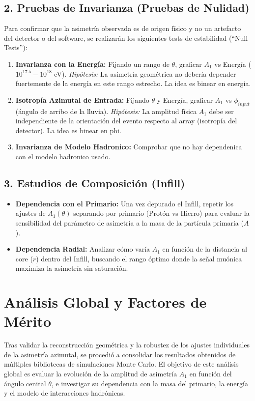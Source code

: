 \subsection*{2. Pruebas de Invarianza (Pruebas de Nulidad)}
Para confirmar que la asimetría observada es de origen físico y no un artefacto del detector o del software, se realizarán los siguientes tests de estabilidad (``Null Tests''):

\begin{enumerate}
	\item \textbf{Invarianza con la Energía:} Fijando un rango de $\theta$, graficar $A_1$ vs Energía ($10^{17.5} - 10^{18}$ eV). \textit{Hipótesis:} La asimetría geométrica no debería depender fuertemente de la energía en este rango estrecho.  La idea es binear en energia.
	\item \textbf{Isotropía Azimutal de Entrada:} Fijando $\theta$ y Energía, graficar $A_1$ vs $\phi_{input}$ (ángulo de arribo de la lluvia). \textit{Hipótesis:} La amplitud física $A_1$ debe ser independiente de la orientación del evento respecto al array (isotropía del detector). La idea es binear en phi.
	\item \textbf{Invarianza de Modelo Hadronico:} Comprobar que no hay dependenica con el modelo hadronico usado.
\end{enumerate}

\subsection*{3. Estudios de Composición (Infill)}
\begin{itemize}
	\item \textbf{Dependencia con el Primario:} Una vez depurado el Infill, repetir los ajustes de $A_1(\theta)$ separando por primario (Protón vs Hierro) para evaluar la sensibilidad del parámetro de asimetría a la masa de la partícula primaria ($A$).
	\item \textbf{Dependencia Radial:} Analizar cómo varía $A_1$ en función de la distancia al core ($r$) dentro del Infill, buscando el rango óptimo donde la señal muónica maximiza la asimetría sin saturación.
\end{itemize}


\section{Análisis Global y Factores de Mérito}
\label{sec:analisis_global}

Tras validar la reconstrucción geométrica y la robustez de los ajustes individuales de la asimetría azimutal, se procedió a consolidar los resultados obtenidos de múltiples bibliotecas de simulaciones Monte Carlo. El objetivo de este análisis global es evaluar la evolución de la amplitud de asimetría $A_1$ en función del ángulo cenital $\theta$, e investigar su dependencia con la masa del primario, la energía y el modelo de interacciones hadrónicas.

